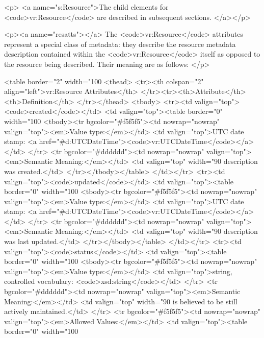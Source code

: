 \documentclass[11pt,a4paper]{ivoa}
\begin{document}
<p>
<a name="s:Resource">The child elements for <code>vr:Resource</code> are described in
subsequent sections.
</a></p>

<p><a name="resatts"></a>
The <code>vr:Resource</code> attributes represent a special class of
metadata: they describe the resource metadata description contained within
the <code>vr:Resource</code> itself as opposed to the resource being
described.  Their meaning are as follows:
</p>

<table border="2" width="100%
<thead>
  <tr><th colspan="2" align="left">vr:Resource Attributes</th>
  </tr><tr><th>Attribute</th><th>Definition</th>
</tr></thead>
<tbody>
  <tr><td valign="top"><code>created</code></td>
      <td valign="top"><table border="0" width="100%
          <tbody><tr bgcolor="#f5f5f5"><td nowrap="nowrap" valign="top"><em>Value type:</em></td>
              <td valign="top">UTC date stamp: <a href="#d:UTCDateTime"><code>vr:UTCDateTime</code></a></td>
          </tr>
          <tr bgcolor="#dddddd"><td nowrap="nowrap" valign="top"><em>Semantic Meaning:</em></td>
              <td valign="top" width="90%
                  description was created.</td> 
          </tr></tbody></table>
      </td></tr>
  <tr><td valign="top"><code>updated</code></td>
      <td valign="top"><table border="0" width="100%
          <tbody><tr bgcolor="#f5f5f5"><td nowrap="nowrap" valign="top"><em>Value type:</em></td>
              <td valign="top">UTC date stamp: <a href="#d:UTCDateTime"><code>vr:UTCDateTime</code></a></td>
          </tr>
          <tr bgcolor="#dddddd"><td nowrap="nowrap" valign="top"><em>Semantic Meaning:</em></td>
              <td valign="top" width="90%
                  description was last updated.</td> 
          </tr></tbody></table>
      </td></tr>
  <tr><td valign="top"><code>status</code></td>
      <td valign="top"><table border="0" width="100%
          <tbody><tr bgcolor="#f5f5f5"><td nowrap="nowrap" valign="top"><em>Value type:</em></td>
              <td valign="top">string, controlled vocabulary:
                               <code>xsd:string</code></td>
          </tr>
          <tr bgcolor="#dddddd"><td nowrap="nowrap" valign="top"><em>Semantic Meaning:</em></td>
              <td valign="top" width="90%
                  is believed to be still actively maintained.</td> 
          </tr>
          <tr bgcolor="#f5f5f5"><td nowrap="nowrap" valign="top"><em>Allowed Values:</em></td>
              <td valign="top"><table border="0" width="100%
\end{document}
